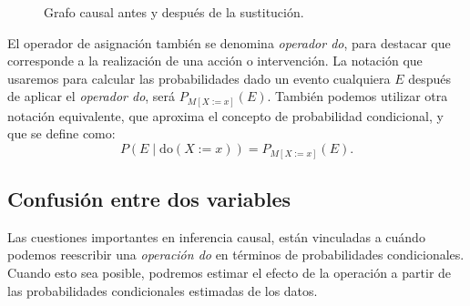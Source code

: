 \documentclass[oneside,openright,titlepage,numbers=noenddot,openany,headinclude,footinclude=true,
cleardoublepage=empty,abstractoff,BCOR=5mm,paper=a4,fontsize=12pt,main=spanish]{scrreprt}
\begin{document}
\begin{figure}[h]
\centering
{}
\caption{Grafo causal antes y después de la sustitución.}
\end{figure}

El operador de asignación también se denomina \textit{operador do}, para destacar que corresponde a la realización de una acción o intervención. La notación que usaremos para calcular las probabilidades dado un evento cualquiera $E$ después de aplicar el \textit{operador do}, será $P_{M[X:=x]}(E)$. También podemos utilizar otra notación equivalente, que aproxima el concepto de probabilidad condicional, y que se define como: 
\begin{equation*}
P(E \mid \text{do}(X:=x))=P_{M[X:=x]}(E).
\end{equation*}

\subsection{Confusión entre dos variables}

Las cuestiones importantes en inferencia causal, están vinculadas a cuándo podemos reescribir una \textit{operación do} en términos de probabilidades condicionales. Cuando esto sea posible, podremos estimar el efecto de la operación a partir de las probabilidades condicionales estimadas de los datos. 
\end{document}
